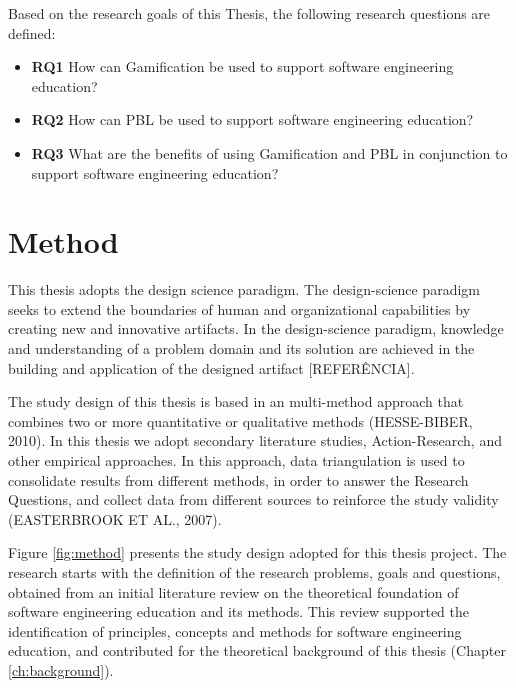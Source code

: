Based on the research goals of this Thesis, the following research questions are defined:

\begin{itemize}
    \item \textbf{RQ1} How can Gamification be used to support software engineering education?
    \item \textbf{RQ2} How can PBL be used to support software engineering education?
    \item \textbf{RQ3} What are the benefits of using Gamification and PBL in conjunction to support software engineering education?
\end{itemize}   

\section{Method}
\label{sec:method}

This thesis adopts the design science paradigm. The design-science paradigm seeks to extend the boundaries of human and organizational capabilities by creating new and innovative artifacts. In the design-science paradigm, knowledge and understanding of a problem domain and its solution are achieved in the building and application of the designed artifact [REFERÊNCIA]. 

The study design of this thesis is based in an multi-method approach that combines two or more quantitative or qualitative methods (HESSE-BIBER, 2010). In this thesis we adopt secondary literature studies, Action-Research, and other empirical approaches. In this approach, data triangulation is used to consolidate results from different methods, in order to answer the Research Questions, and collect data from different sources to reinforce the study validity (EASTERBROOK ET AL., 2007).
 
Figure \ref{fig:method} presents the study design adopted for this thesis project. The research starts with the definition of the research problems, goals and questions, obtained from an initial literature review on the theoretical foundation of software engineering education and its methods. This review supported the identification of principles, concepts and methods for software engineering education, and contributed for the theoretical background of this thesis (Chapter \ref{ch:background}).
 
